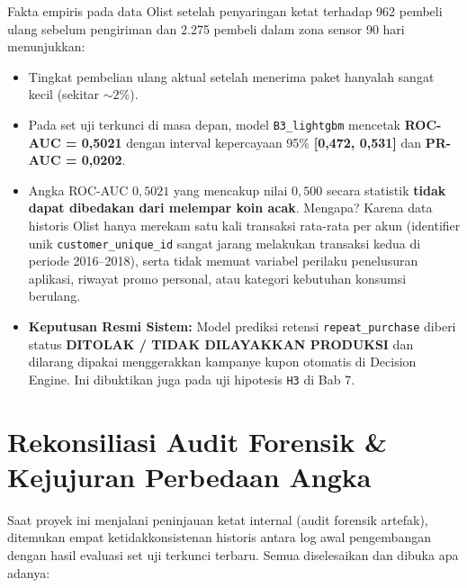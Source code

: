 \documentclass[11pt,a4paper,oneside]{book}
\newcommand{\code}[1]{{\small\nolinkurl{#1}}}
\begin{document}
Fakta empiris pada data Olist setelah penyaringan ketat terhadap 962 pembeli ulang sebelum pengiriman dan 2.275 pembeli dalam zona sensor 90 hari menunjukkan:
\begin{itemize}
  \item Tingkat pembelian ulang aktual setelah menerima paket hanyalah sangat kecil (sekitar $\sim 2\%$).
  \item Pada set uji terkunci di masa depan, model \code{B3_lightgbm} mencetak \textbf{ROC-AUC = 0,5021} dengan interval kepercayaan 95\% \textbf{[0,472, 0,531]} dan \textbf{PR-AUC = 0,0202}.
  \item Angka ROC-AUC $0{,}5021$ yang mencakup nilai $0{,}500$ secara statistik \textbf{tidak dapat dibedakan dari melempar koin acak}. Mengapa? Karena data historis Olist hanya merekam satu kali transaksi rata-rata per akun (identifier unik \code{customer_unique_id} sangat jarang melakukan transaksi kedua di periode 2016--2018), serta tidak memuat variabel perilaku penelusuran aplikasi, riwayat promo personal, atau kategori kebutuhan konsumsi berulang.
  \item \textbf{Keputusan Resmi Sistem:} Model prediksi retensi \code{repeat_purchase} diberi status \textbf{DITOLAK / TIDAK DILAYAKKAN PRODUKSI} dan dilarang dipakai menggerakkan kampanye kupon otomatis di Decision Engine. Ini dibuktikan juga pada uji hipotesis \code{H3} di Bab 7.
\end{itemize}

\section{Rekonsiliasi Audit Forensik \& Kejujuran Perbedaan Angka}

Saat proyek ini menjalani peninjauan ketat internal (audit forensik artefak), ditemukan empat ketidakkonsistenan historis antara log awal pengembangan dengan hasil evaluasi set uji terkunci terbaru. Semua diselesaikan dan dibuka apa adanya:
\end{document}
